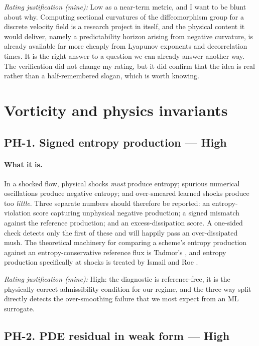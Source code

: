 \documentclass[11pt]{article}
\newcommand{\High}{\textbf{High}}
\newcommand{\rating}[1]{\par\smallskip\noindent\textit{Rating justification (mine):} #1}
\begin{document}
\rating{Low as a near-term metric, and I want to be blunt about why. Computing sectional
curvatures of the diffeomorphism group for a discrete velocity field is a research project
in itself, and the physical content it would deliver, namely a predictability horizon
arising from negative curvature, is already available far more cheaply from Lyapunov
exponents and decorrelation times. It is the right answer to a question we can already
answer another way. The verification did not change my rating, but it did confirm that the
idea is real rather than a half-remembered slogan, which is worth knowing.}

\section{Vorticity and physics invariants}

\subsection{PH-1. Signed entropy production --- \High{}}

\paragraph{What it is.} In a shocked flow, physical shocks \emph{must} produce entropy;
spurious numerical oscillations produce negative entropy; and over-smeared learned shocks
produce too \emph{little}. Three separate numbers should therefore be reported: an
entropy-violation score capturing unphysical negative production; a signed mismatch against
the reference production; and an excess-dissipation score. A one-sided check detects only
the first of these and will happily pass an over-dissipated mush. The theoretical machinery
for comparing a scheme's entropy production against an entropy-conservative reference flux
is Tadmor's \cite{tadmor1987,tadmor2003}, and entropy production specifically at shocks is
treated by Ismail and Roe \cite{ismailroe2009}.

\rating{High: the diagnostic is reference-free, it is the physically correct admissibility
condition for our regime, and the three-way split directly detects the over-smoothing
failure that we most expect from an ML surrogate.}

\subsection{PH-2. PDE residual in weak form --- \High{}}
\end{document}
